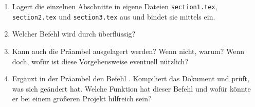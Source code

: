 \begin{enumerate}
  \item Lagert die einzelnen Abschnitte in eigene Dateien \texttt{section1.tex}, \texttt{section2.tex} und \texttt{section3.tex} aus und bindet sie mittels \texttt{} ein.
  \item Welcher Befehl wird durch \texttt{} überflüssig?
  \item Kann auch die Präambel ausgelagert werden? Wenn nicht, warum? Wenn doch, wofür ist diese Vorgehensweise eventuell nützlich?
  \item Ergänzt in der Präambel den Befehl \texttt{}. Kompiliert das Dokument und prüft, was sich geändert hat. Welche Funktion hat dieser Befehl und wofür könnte er bei einem größeren Projekt hilfreich sein? 
\end{enumerate}